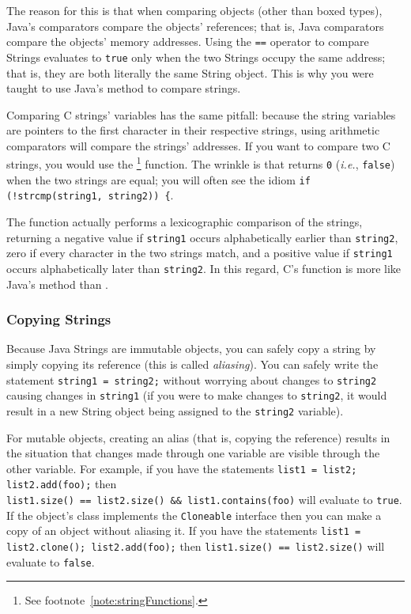 The reason for this is that when comparing objects (other than boxed types), Java's comparators compare the objects' references;
that is, Java comparators compare the objects' memory addresses.
Using the \lstinline{==} operator to compare Strings evaluates to \lstinline{true} only when the two Strings occupy the same address;
that is, they are both literally the same String object.
This is why you were taught to use Java's  method to compare strings.

Comparing C strings' variables has the same pitfall:
because the string variables are pointers to the first character in their respective strings, using arithmetic comparators will compare the strings' addresses.
If you want to compare two C strings, you would use the \footnote{See footnote~\ref{note:stringFunctions}.} function.
The wrinkle is that  returns \lstinline{0} (\textit{i.e.}, \lstinline{false}) when the two strings are equal;
you will often see the idiom \lstinline{if (!strcmp(string1, string2)) {}.

The  function actually performs a lexicographic comparison of the strings, returning a negative value if \lstinline{string1} occurs alphabetically earlier than \lstinline{string2}, zero if every character in the two strings match, and a positive value if \lstinline{string1} occurs alphabetically later than \lstinline{string2}.
In this regard, C's  function is more like Java's  method than .

\subsubsection{Copying Strings}

Because Java Strings are immutable objects, you can safely copy a string by simply copying its reference (this is called \textit{aliasing}).
You can safely write the statement \lstinline{string1 = string2;} without worrying about changes to \lstinline{string2} causing changes in \lstinline{string1}
(if you were to make changes to \lstinline{string2}, it would result in a new String object being assigned to the \lstinline{string2} variable).

For mutable objects, creating an alias (that is, copying the reference) results in the situation that changes made through one variable are visible through the other variable.
For example, if you have the statements \lstinline{list1 = list2; list2.add(foo);} then \\ \lstinline{list1.size() == list2.size() && list1.contains(foo)} will evaluate to \lstinline{true}.
If the object's class implements the \lstinline{Cloneable} interface then you can make a copy of an object without aliasing it.
If you have the statements \lstinline{list1 = list2.clone(); list2.add(foo);} then \lstinline{list1.size() == list2.size()} will evaluate to \lstinline{false}.

